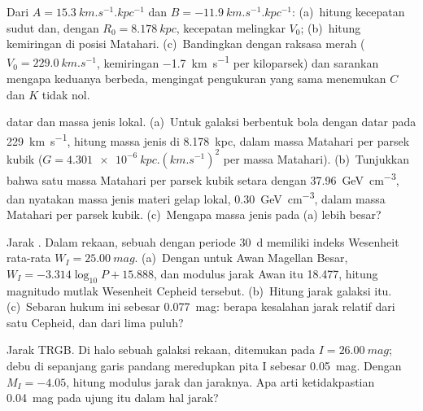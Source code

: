 \begin{exercise}[$\star\star$]\label{exo:b3:milky-way-galaxies:5}
Dari  $A = \qty{15.3}{km.s^{-1}.kpc^{-1}}$ dan
$B = \qty{-11.9}{km.s^{-1}.kpc^{-1}}$: (a)~hitung kecepatan sudut
 dan, dengan $R_0 = \qty{8.178}{kpc}$, kecepatan melingkar $V_0$;
(b)~hitung kemiringan  di posisi Matahari. (c)~Bandingkan
dengan  raksasa merah ($V_0 = \qty{229.0}{km.s^{-1}}$,
kemiringan \qty{-1.7}{km.s^{-1}} per kiloparsek) dan sarankan mengapa keduanya
berbeda, mengingat pengukuran yang sama menemukan $C$ dan $K$ tidak nol.
\end{exercise}

\begin{exercise}[$\star\star$]\label{exo:b3:milky-way-galaxies:6}
 datar dan massa jenis lokal. (a)~Untuk galaksi berbentuk bola
dengan  datar pada \qty{229}{km.s^{-1}}, hitung massa jenis di
\qty{8.178}{kpc}, dalam massa Matahari per parsek kubik
($G = \qty{4.301e-6}{kpc.(km.s^{-1})^2}$ per massa Matahari). (b)~Tunjukkan bahwa
satu massa Matahari per parsek kubik setara dengan \qty{37.96}{GeV.cm^{-3}}, dan nyatakan
massa jenis materi gelap lokal, \qty{0.30}{GeV.cm^{-3}}, dalam massa Matahari
per parsek kubik. (c)~Mengapa massa jenis pada (a) lebih besar?
\end{exercise}

\begin{exercise}[$\star\star$]\label{exo:b3:milky-way-galaxies:7}
Jarak . Dalam  rekaan, sebuah  dengan periode
\qty{30}{d} memiliki indeks Wesenheit rata-rata $W_I = \qty{25.00}{mag}$.
(a)~Dengan  untuk Awan Magellan Besar,
$W_I = -3.314\log_{10}P + 15.888$, dan modulus jarak Awan itu
18.477, hitung magnitudo mutlak Wesenheit Cepheid tersebut. (b)~Hitung
jarak galaksi itu. (c)~Sebaran hukum ini sebesar \qty{0.077}{mag}: berapa
kesalahan jarak relatif dari satu Cepheid, dan dari lima puluh?
\end{exercise}

\begin{exercise}[$\star\star$]\label{exo:b3:milky-way-galaxies:8}
Jarak TRGB. Di halo sebuah galaksi rekaan,  ditemukan pada $I = \qty{26.00}{mag}$; debu di sepanjang garis pandang
meredupkan pita I sebesar \qty{0.05}{mag}. Dengan $M_I = -4.05$, hitung
modulus jarak dan jaraknya. Apa arti ketidakpastian
\qty{0.04}{mag} pada ujung itu dalam hal jarak?
\end{exercise}

